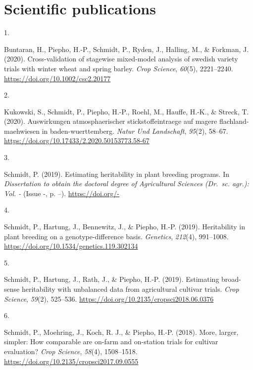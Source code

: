 \documentclass[11pt, a4paper]{awesome-cv}
\newlength{\csllabelwidth}
\newcommand{\CSLLeftMargin}[1]{\parbox[t]{\csllabelwidth}{#1}}
\newcommand{\CSLRightInline}[1]{\parbox[t]{\linewidth - \csllabelwidth}{#1}}
\begin{document}
\hypertarget{scientific-publications}{%
\section{Scientific publications}\label{scientific-publications}}

\footnotesize

\hypertarget{bibliography}{}
\leavevmode\hypertarget{ref-Buntaran2020}{}%
\CSLLeftMargin{1. }
\CSLRightInline{Buntaran, H., Piepho, H.-P., Schmidt, P., Ryden, J.,
Halling, M., \& Forkman, J. (2020). Cross-validation of stagewise
mixed-model analysis of swedish variety trials with winter wheat and
spring barley. \emph{Crop Science}, \emph{60}(5), 2221--2240.
\url{https://doi.org/10.1002/csc2.20177}}

\leavevmode\hypertarget{ref-Kukowski2020}{}%
\CSLLeftMargin{2. }
\CSLRightInline{Kukowski, S., Schmidt, P., Piepho, H.-P., Roehl, M.,
Hauffe, H.-K., \& Streck, T. (2020). Auswirkungen atmosphaerischer
stickstoffeintraege auf magere flachland-maehwiesen in
baden-wuerttemberg. \emph{Natur Und Landschaft}, \emph{95}(2), 58--67.
\url{https://doi.org/10.17433/2.2020.50153773.58-67}}

\leavevmode\hypertarget{ref-Schmidt2019}{}%
\CSLLeftMargin{3. }
\CSLRightInline{Schmidt, P. (2019). Estimating heritability in plant
breeding programs. In \emph{Dissertation to obtain the doctoral degree
of Agricultural Sciences (Dr.~sc. agr.): Vol. -} (Issue -, p. --).
\url{https://doi.org/-}}

\leavevmode\hypertarget{ref-Schmidt2019b}{}%
\CSLLeftMargin{4. }
\CSLRightInline{Schmidt, P., Hartung, J., Bennewitz, J., \& Piepho,
H.-P. (2019). Heritability in plant breeding on a genotype-difference
basis. \emph{Genetics}, \emph{212}(4), 991--1008.
\url{https://doi.org/10.1534/genetics.119.302134}}

\leavevmode\hypertarget{ref-Schmidt2019c}{}%
\CSLLeftMargin{5. }
\CSLRightInline{Schmidt, P., Hartung, J., Rath, J., \& Piepho, H.-P.
(2019). Estimating broad-sense heritability with unbalanced data from
agricultural cultivar trials. \emph{Crop Science}, \emph{59}(2),
525--536. \url{https://doi.org/10.2135/cropsci2018.06.0376}}

\leavevmode\hypertarget{ref-Schmidt2018}{}%
\CSLLeftMargin{6. }
\CSLRightInline{Schmidt, P., Moehring, J., Koch, R. J., \& Piepho, H.-P.
(2018). More, larger, simpler: How comparable are on-farm and on-station
trials for cultivar evaluation? \emph{Crop Science}, \emph{58}(4),
1508--1518. \url{https://doi.org/10.2135/cropsci2017.09.0555}}
\end{document}
